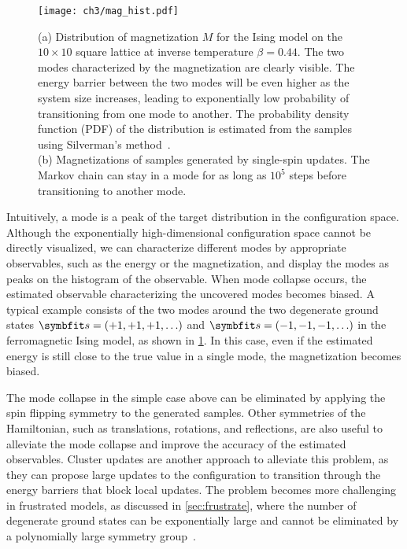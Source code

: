\begin{figure}[htb]
\centering
\texttt{[image: ch3/mag\_hist.pdf]}
\caption[Distribution and sampling of magnetization for Ising model]{
(a) Distribution of magnetization $M$ for the Ising model on the $10 \times 10$ square lattice at inverse temperature $\beta = 0.44$.
The two modes characterized by the magnetization are clearly visible.
The energy barrier between the two modes will be even higher as the system size increases, leading to exponentially low probability of transitioning from one mode to another.
The probability density function (PDF) of the distribution is estimated from the samples using Silverman’s method~\cite{silverman1986density}. \\
(b) Magnetizations of samples generated by single-spin updates. The Markov chain can stay in a mode for as long as $10^5$ steps before transitioning to another mode.
}
\label{fig:mag-hist}
\end{figure}

Intuitively, a mode is a peak of the target distribution in the configuration space. Although the exponentially high-dimensional configuration space cannot be directly visualized, we can characterize different modes by appropriate observables, such as the energy or the magnetization, and display the modes as peaks on the histogram of the observable. When mode collapse occurs, the estimated observable characterizing the uncovered modes becomes biased. A typical example consists of the two modes around the two degenerate ground states $\vs = (+1, +1, +1, \ldots)$ and $\vs = (-1, -1, -1, \ldots)$ in the ferromagnetic Ising model, as shown in \cref{fig:mag-hist}. In this case, even if the estimated energy is still close to the true value in a single mode, the magnetization becomes biased.

The mode collapse in the simple case above can be eliminated by applying the spin flipping symmetry to the generated samples. Other symmetries of the Hamiltonian, such as translations, rotations, and reflections, are also useful to alleviate the mode collapse and improve the accuracy of the estimated observables. Cluster updates are another approach to alleviate this problem, as they can propose large updates to the configuration to transition through the energy barriers that block local updates. The problem becomes more challenging in frustrated models, as discussed in \cref{sec:frustrate}, where the number of degenerate ground states can be exponentially large and cannot be eliminated by a polynomially large symmetry group~\cite{wannier1950antiferromagnetism, mambrini1999residual, vanderstraeten2018residual}.


